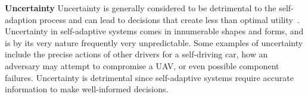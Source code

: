 \documentclass[11pt]{proposalnsf}
\newlength\q %
\begin{document}
\begin{sloppypar}






\vspace{2mm} \noindent \textbf{Uncertainty} Uncertainty is generally considered to be detrimental to the self-adaption process and can lead to decisions that create less than optimal utility~\cite{calinescu2011dynamic, camara2017reasoning, esfahani2013uncertainty}. Uncertainty in self-adaptive systems comes in innumerable shapes and forms, and is by its very nature frequently very unpredictable. Some examples of uncertainty include the precise actions of other drivers for a self-driving car, how an adversary may attempt to compromise a UAV, or even possible component failures. Uncertainty is detrimental since self-adaptive systems require accurate information to make well-informed decisions. 






\end{sloppypar}
\end{document}
